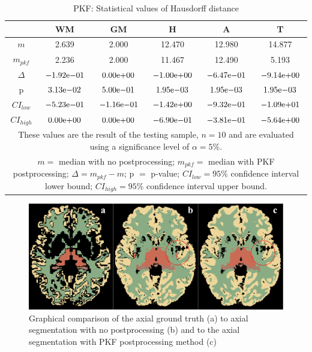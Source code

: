 \documentclass[journal]{IEEEtran}
\begin{document}
\begin{table}[ht]

\renewcommand{\arraystretch}{1.3}
\caption{PKF: Statistical values of Hausdorff distance}
\label{tbl_pkf_hd}
\centering
\begin{tabular}{c|c|c|c|c|c}
\hline
 & WM & GM & H & A & T\\
\hline
$m$ &2.639&2.000&12.470&12.980&14.877\\
$m_{pkf}$&2.236&2.000&11.467&12.490&5.193\\
$\Delta$&${-1.92}\mathrm{e}{-01}$&${0.00}\mathrm{e}{+00}$&${-1.00}\mathrm{e}{+00}$&${-6.47}\mathrm{e}{-01}$&${-9.14}\mathrm{e}{+00}$\\
p&${3.13}\mathrm{e}{-02}$&${5.00}\mathrm{e}{-01}$&${1.95}\mathrm{e}{-03}$&${1.95}\mathrm{e}{-03}$&${1.95}\mathrm{e}{-03}$\\
$CI_{low}$&${-5.23}\mathrm{e}{-01}$&${-1.16}\mathrm{e}{-01}$&${-1.42}\mathrm{e}{+00}$&${-9.32}\mathrm{e}{-01}$&${-1.09}\mathrm{e}{+01}$\\
$CI_{high}$&${0.00}\mathrm{e}{+00}$&${0.00}\mathrm{e}{+00}$&${-6.90}\mathrm{e}{-01}$&${-3.81}\mathrm{e}{-01}$&${-5.64}\mathrm{e}{+00}$\\
\hline
\multicolumn{6}{p{\textwidth}}{These values are the result of the testing sample, $n=10$ and are evaluated using a significance level of $\alpha = 5\%$. }\\
\multicolumn{6}{p{\textwidth}}{$m=$ median with no postprocessing; $m_{pkf}=$ median with PKF postprocessing; $\Delta=m_{pkf}-m$; p $=$ p-value;  $CI_{low}= 95\%$ confidence interval lower bound; $CI_{high}= 95\%$ confidence interval upper bound.}\\

\end{tabular}

\end{table}

\begin{figure}[ht]
\centering
\includegraphics[width=\textwidth]{MIALab_Report/img/boxplots/PKF.png}
\caption{Graphical comparison of the axial ground truth (a) to axial segmentation with no postprocessing (b) and to the axial segmentation with PKF postprocessing method (c) }
\label{fig_pkf}
\end{figure}
\end{document}

